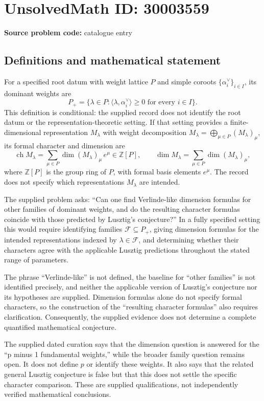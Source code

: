\documentclass[11pt]{article}
\newcommand{\Z}{\mathbb{Z}}
\begin{document}
\section*{UnsolvedMath ID: 30003559}
\textbf{Source problem code:} catalogue entry
\subsection{Definitions and mathematical statement}
For a specified root datum with weight lattice \(P\) and simple coroots \(\{\alpha_i^\vee\}_{i\in I}\), its dominant weights are
\[
P_+=\{\lambda\in P:\langle\lambda,\alpha_i^\vee\rangle\geq 0\text{ for every }i\in I\}.
\]
This definition is conditional: the supplied record does not identify the root datum or the representation-theoretic setting. If that setting provides a finite-dimensional representation \(M_\lambda\) with weight decomposition \(M_\lambda=\bigoplus_{\mu\in P}(M_\lambda)_\mu\), its formal character and dimension are
\[
\operatorname{ch}M_\lambda=\sum_{\mu\in P}\dim (M_\lambda)_\mu\,e^\mu\in\Z[P],
\qquad
\dim M_\lambda=\sum_{\mu\in P}\dim (M_\lambda)_\mu,
\]
where \(\Z[P]\) is the group ring of \(P\), with formal basis elements \(e^\mu\). The record does not specify which representations \(M_\lambda\) are intended.

The supplied problem asks: ``Can one find Verlinde-like dimension formulas for other families of dominant weights, and do the resulting character formulas coincide with those predicted by Lusztig’s conjecture?'' In a fully specified setting this would require identifying families \(\mathcal F\subseteq P_+\), giving dimension formulas for the intended representations indexed by \(\lambda\in\mathcal F\), and determining whether their characters agree with the applicable Lusztig predictions throughout the stated range of parameters.

The phrase ``Verlinde-like'' is not defined, the baseline for ``other families'' is not identified precisely, and neither the applicable version of Lusztig's conjecture nor its hypotheses are supplied. Dimension formulas alone do not specify formal characters, so the construction of the ``resulting character formulas'' also requires clarification. Consequently, the supplied evidence does not determine a complete quantified mathematical conjecture.

The supplied dated curation says that the dimension question is answered for the ``p minus 1 fundamental weights,'' while the broader family question remains open. It does not define \(p\) or identify these weights. It also says that the related general Lusztig conjecture is false but that this does not settle the specific character comparison. These are supplied qualifications, not independently verified mathematical conclusions.
\end{document}
